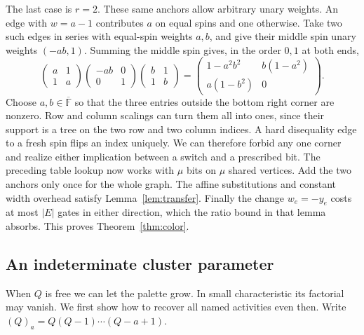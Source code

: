 \documentclass[11pt]{article}
\theoremstyle{definition}
\newcommand{\F}{\mathbb F}
\newcommand{\olF}{\overline{\F}}
\begin{document}
The last case is \(r=2\). These same anchors allow arbitrary unary weights. An edge with \(w=a-1\) contributes \(a\) on equal spins and one otherwise. Take two such edges in series with equal-spin weights \(a,b\), and give their middle spin unary weights \((-ab,1)\). Summing the middle spin gives, in the order \(0,1\) at both ends,
\[
 \begin{pmatrix}a&1\\1&a\end{pmatrix}
 \begin{pmatrix}-ab&0\\0&1\end{pmatrix}
 \begin{pmatrix}b&1\\1&b\end{pmatrix}
 =
 \begin{pmatrix}1-a^2b^2& b(1-a^2)\\ a(1-b^2)&0\end{pmatrix}.
\]
Choose \(a,b\in\olF\) so that the three entries outside the bottom right corner are nonzero. Row and column scalings can turn them all into ones, since their support is a tree on the two row and two column indices. A hard disequality edge to a fresh spin flips an index uniquely. We can therefore forbid any one corner and realize either implication between a switch and a prescribed bit. The preceding table lookup now works with \(\mu\) bits on \(\mu\) shared vertices. Add the two anchors only once for the whole graph. The affine substitutions and constant width overhead satisfy Lemma~\ref{lem:transfer}. Finally the change \(w_e=-y_e\) costs at most \(|E|\) gates in either direction, which the ratio bound in that lemma absorbs. This proves Theorem~\ref{thm:color}.

\subsection{An indeterminate cluster parameter}

When \(Q\) is free we can let the palette grow. In small characteristic its factorial may vanish. We first show how to recover all named activities even then. Write \((Q)_a=Q(Q-1)\cdots(Q-a+1)\).
\end{document}
